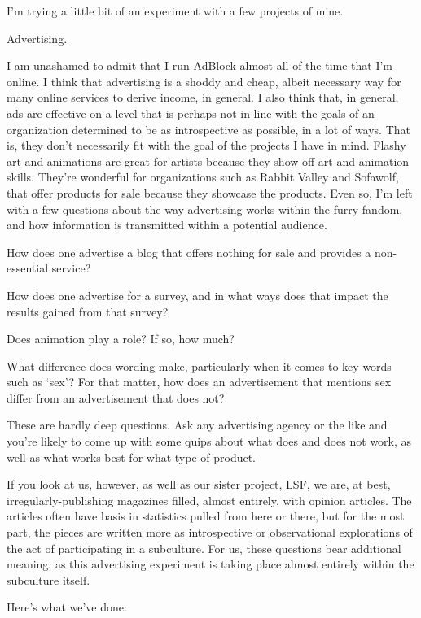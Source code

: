 I'm trying a little bit of an experiment with a few projects of mine.

Advertising.

I am unashamed to admit that I run AdBlock almost all of the time that
I'm online. I think that advertising is a shoddy and cheap, albeit
necessary way for many online services to derive income, in general. I
also think that, in general, ads are effective on a level that is
perhaps not in line with the goals of an organization determined to be
as introspective as possible, in a lot of ways. That is, they don't
necessarily fit with the goal of the projects I have in mind. Flashy art
and animations are great for artists because they show off art and
animation skills. They're wonderful for organizations such as Rabbit
Valley and Sofawolf, that offer products for sale because they showcase
the products. Even so, I'm left with a few questions about the way
advertising works within the furry fandom, and how information is
transmitted within a potential audience.

How does one advertise a blog that offers nothing for sale and provides
a non-essential service?

How does one advertise for a survey, and in what ways does that impact
the results gained from that survey?

Does animation play a role? If so, how much?

What difference does wording make, particularly when it comes to key
words such as `sex'? For that matter, how does an advertisement that
mentions sex differ from an advertisement that does not?

These are hardly deep questions. Ask any advertising agency or the like
and you're likely to come up with some quips about what does and does
not work, as well as what works best for what type of product.

If you look at us, however, as well as our sister project, LSF, we are,
at best, irregularly-publishing magazines filled, almost entirely, with
opinion articles. The articles often have basis in statistics pulled
from here or there, but for the most part, the pieces are written more
as introspective or observational explorations of the act of
participating in a subculture. For us, these questions bear additional
meaning, as this advertising experiment is taking place almost entirely
within the subculture itself.

Here's what we've done:

